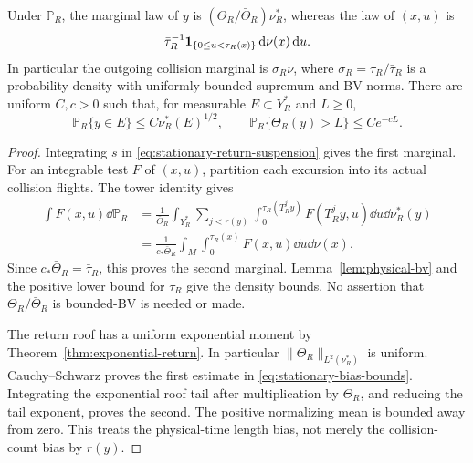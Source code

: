 \begin{lemma}
\label{lem:stationary-length-bias}
Under $\mathbb P_R$, the marginal law of $y$ is
$(\Theta_R/\bar\Theta_R)\nu_R^*$, whereas the law of $(x,u)$ is
\begin{equation}\label{eq:collision-suspension-marginal}
 \bar\tau_R^{-1}\one_{\{0\le u<\tau_R(x)\}}\dd\nu(x)\dd u.
\end{equation}
In particular the outgoing collision marginal is
$\sigma_R\nu$, where $\sigma_R=\tau_R/\bar\tau_R$ is a probability
density with uniformly bounded supremum and BV norms.
There are uniform $C,c>0$ such that, for measurable $E\subset Y_R^*$
and $L\ge0$,
\begin{equation}\label{eq:stationary-bias-bounds}
 \mathbb P_R\{y\in E\}\le C\nu_R^*(E)^{1/2},\qquad
 \mathbb P_R\{\Theta_R(y)>L\}\le Ce^{-cL}.
\end{equation}
\end{lemma}
\begin{proof}
Integrating $s$ in \eqref{eq:stationary-return-suspension} gives the
first marginal. For an integrable test $F$ of $(x,u)$, partition each
excursion into its actual collision flights. The tower identity gives
\begin{align*}
 \int F(x,u)\dd\mathbb P_R
 &=\frac1{\bar\Theta_R}\int_{Y_R^*}\sum_{j<r(y)}
       \int_0^{\tau_R(T_R^jy)}F(T_R^jy,u)\dd u\dd\nu_R^*(y)\\
 &=\frac1{c_*\bar\Theta_R}\int_M\int_0^{\tau_R(x)}F(x,u)\dd u\dd\nu(x).
\end{align*}
Since $c_*\bar\Theta_R=\bar\tau_R$, this proves the second marginal.
Lemma~\ref{lem:physical-bv} and the positive lower bound for
$\bar\tau_R$ give the density bounds. No assertion that
$\Theta_R/\bar\Theta_R$ is bounded-BV is needed or made.

The return roof has a uniform exponential moment by
Theorem~\ref{thm:exponential-return}. In particular
$\|\Theta_R\|_{L^2(\nu_R^*)}$ is uniform. Cauchy--Schwarz proves
the first estimate in \eqref{eq:stationary-bias-bounds}. Integrating
the exponential roof tail after multiplication by $\Theta_R$, and
reducing the tail exponent, proves the second. The positive normalizing
mean is bounded away from zero. This treats the physical-time length
bias, not merely the collision-count bias by $r(y)$.
\end{proof}

